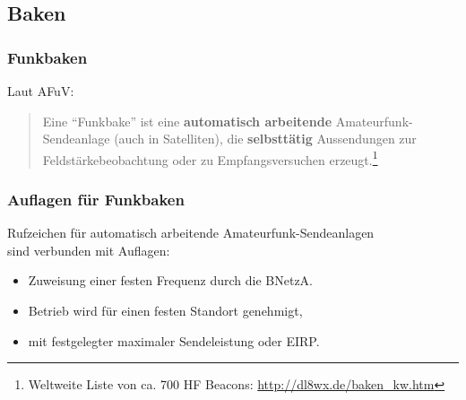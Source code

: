 \subsection{Baken}

\begin{frame}
  \frametitle{Funkbaken}

  Laut AFuV:

  \begin{quote}
    Eine ``Funkbake'' ist eine \textbf{automatisch arbeitende} Amateurfunk-Sendeanlage
    (auch in Satelliten), die \textbf{selbsttätig} Aussendungen zur
    Feldstärkebeobachtung oder zu Empfangsversuchen erzeugt.\footnote{
      Weltweite Liste von ca. 700 HF Beacons: \ExternalLink\url{http://dl8wx.de/baken_kw.htm}}\\[1.5em]
  \end{quote}


\end{frame}

\begin{frame}
  \frametitle{Auflagen für Funkbaken}

  Rufzeichen für automatisch arbeitende Amateurfunk-Sendeanlagen\\
  sind verbunden mit Auflagen:\\[1em]

  \begin{itemize}
    \item Zuweisung einer festen Frequenz durch die BNetzA.
    \item Betrieb wird für einen festen Standort genehmigt,
    \item mit festgelegter maximaler Sendeleistung oder EIRP.
  \end{itemize}

\end{frame}

